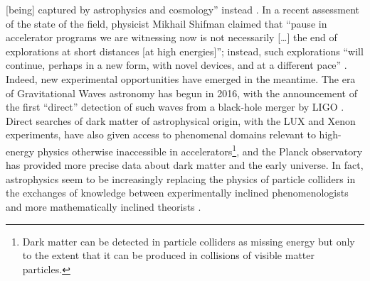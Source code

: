 \documentclass{article}
\begin{document}
[being] captured by astrophysics and cosmology'' instead \citep{Kosyakov2023}. In a recent assessment of the state of the field, physicist Mikhail Shifman claimed that ``pause in accelerator programs we are witnessing now is not necessarily [\dots] the end of explorations at short distances [at high energies]''; instead, such explorations ``will continue, perhaps in a new form, with novel devices, and at a different pace'' \citep{Shifman2020}. Indeed, new experimental opportunities have emerged in the meantime. The era of Gravitational Waves astronomy has begun in 2016, with the announcement of the first ``direct'' detection of such waves from a black-hole merger by LIGO \citep{Abbott2016}. Direct searches of dark matter of astrophysical origin, with the LUX and Xenon experiments, have also given access to phenomenal domains relevant to high-energy physics otherwise inaccessible in accelerators\footnote{Dark matter can be detected in particle colliders as missing energy but only to the extent that it can be produced in collisions of visible matter particles.}, and the Planck observatory \citep{planck2011planck} has provided more precise data about dark matter and the early universe. %
In fact, astrophysics seem to be increasingly replacing the physics of particle colliders in the exchanges of knowledge between experimentally inclined phenomenologists and more mathematically inclined theorists \citep{Gautheron2023}.
\end{document}
